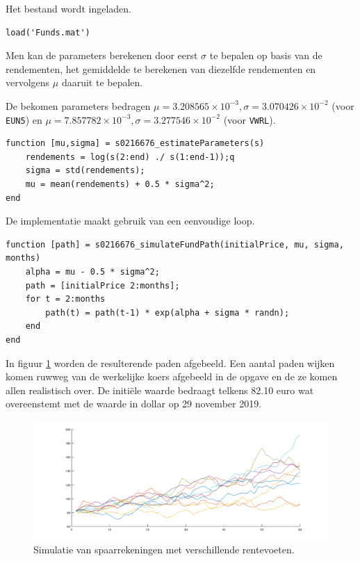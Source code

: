 

Het bestand wordt ingeladen.

\begin{lstlisting}
load('Funds.mat')
\end{lstlisting}



Men kan de parameters berekenen door eerst $\sigma$ te bepalen op basis van de rendementen, het gemiddelde te berekenen van diezelfde rendementen en vervolgens $\mu$ daaruit te bepalen.\\
\par\noindent De bekomen parameters bedragen $\mu = 3.208565\times 10^{-3}, \sigma = 3.070426\times 10^{-2}$ (voor \texttt{EUN5}) en $\mu = 7.857782\times 10^{-3}, \sigma = 3.277546\times 10^{-2}$ (voor \texttt{VWRL}).

\begin{lstlisting}
function [mu,sigma] = s0216676_estimateParameters(s)
    rendements = log(s(2:end) ./ s(1:end-1));q
    sigma = std(rendements);
    mu = mean(rendements) + 0.5 * sigma^2;
end
\end{lstlisting}



De implementatie maakt gebruik van een eenvoudige  loop.

\begin{lstlisting}
function [path] = s0216676_simulateFundPath(initialPrice, mu, sigma, months)
    alpha = mu - 0.5 * sigma^2;
    path = [initialPrice 2:months];
    for t = 2:months
        path(t) = path(t-1) * exp(alpha + sigma * randn);
    end
end
\end{lstlisting}



In figuur \ref{fig:op6} worden de resulterende paden afgebeeld. Een aantal paden wijken komen ruwweg van de werkelijke koers afgebeeld in de opgave en de ze komen allen realistisch over. De initi\"ele waarde bedraagt telkens 82.10 euro wat overeenstemt met de waarde in dollar op 29 november 2019.

\begin{figure}[h]
\centering
\includegraphics[width=\textwidth]{res/op6.png}
\caption{Simulatie van spaarrekeningen met verschillende rentevoeten.}
\label{fig:op6}
\end{figure}

